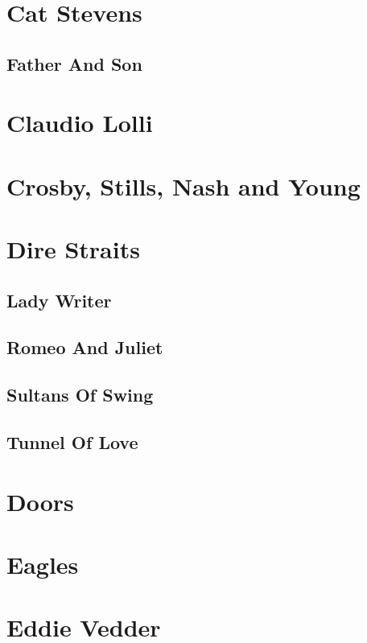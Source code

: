 \chapter{Cat Stevens}
\section{Father And Son}

\chapter{Claudio Lolli}

\chapter{Crosby, Stills, Nash and Young}

\chapter{Dire Straits}
\section{Lady Writer}
\section{Romeo And Juliet}
\section{Sultans Of Swing}
\section{Tunnel Of Love}

\chapter{Doors}

\chapter{Eagles}

\chapter{Eddie Vedder}

